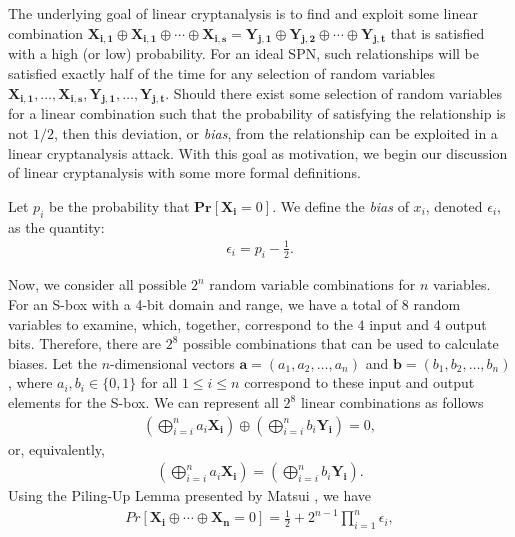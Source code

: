 The underlying goal of linear cryptanalysis is to find and exploit some linear combination $\mathbf{X_{i,1}} \oplus \mathbf{X_{i,1}} \oplus \dotsb \oplus \mathbf{X_{i,s}} = \mathbf{Y_{j,1}} \oplus \mathbf{Y_{j,2}} \oplus \dotsb \oplus \mathbf{Y_{j,t}}$ that is satisfied with a high (or low) probability. For an ideal SPN, such relationships will be satisfied exactly half of the time for any selection of random variables $\mathbf{X_{i,1}},\dots,\mathbf{X_{i,s}},\mathbf{Y_{j,1}},\dots,\mathbf{Y_{j,t}}$. Should there exist some selection of random variables for a linear combination such that the probability of satisfying the relationship is not $1/2$, then this deviation, or \emph{bias}, from the relationship can be exploited in a linear cryptanalysis attack. With this goal as motivation, we begin our discussion of linear cryptanalysis with some more formal definitions.
\begin{definition}
Let $p_i$ be the probability that $\mathbf{Pr}[\mathbf{X_i} = 0]$. We define the \emph{bias} of $x_i$, denoted $\epsilon_i$, as the quantity:
\begin{align*}
\epsilon_i = p_i - \frac{1}{2}.
\end{align*}
\end{definition}
Now, we consider all possible $2^n$ random variable combinations for $n$ variables. For an S-box with a 4-bit domain and range, we have a total of $8$ random variables to examine, which, together, correspond to the $4$ input and $4$ output bits. Therefore, there are $2^8$ possible combinations that can be used to calculate biases. Let the $n$-dimensional vectors $\mathbf{a} = ( a_1,a_2,\dots,a_n )$ and $\mathbf{b} = ( b_1,b_2,\dots,b_n )$, where $a_i, b_i \in \{0,1\}$ for all $1 \leq i \leq n$ correspond to these input and output elements for the S-box. We can represent all $2^8$ linear combinations as follows
\begin{align*}
\left(\bigoplus_{i=i}^{n}a_i\mathbf{X_i}\right) \oplus \left(\bigoplus_{i=i}^{n}b_i\mathbf{Y_i}\right) = 0,
\end{align*}
or, equivalently,
\begin{align*}
\left(\bigoplus_{i=i}^{n}a_i\mathbf{X_i}\right) = \left(\bigoplus_{i=i}^{n}b_i\mathbf{Y_i}\right).
\end{align*}
Using the Piling-Up Lemma presented by Matsui \cite{Matsui91-1}, we have 
\begin{align*}
Pr[\mathbf{X_i} \oplus \dotsb \oplus \mathbf{X_n} = 0] = \frac{1}{2} + 2^{n-1} \prod_{i=1}^{n}\epsilon_i,
\end{align*}
